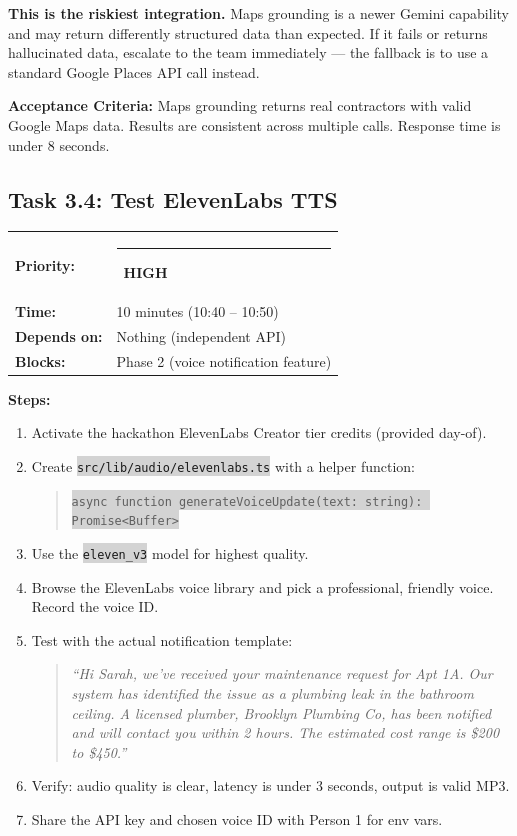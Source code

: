 \documentclass[11pt, a4paper]{article}
\newcommand{\highpri}{\textcolor{highamber}{\rule{6pt}{6pt}}~\textcolor{highamber}{\scriptsize\textbf{HIGH}}}
\newcommand{\code}[1]{\texttt{\small\colorbox{lightgray}{#1}}}
\begin{document}
\begin{warningbox}
\textbf{This is the riskiest integration.} Maps grounding is a newer Gemini capability and may return differently structured data than expected. If it fails or returns hallucinated data, escalate to the team immediately --- the fallback is to use a standard Google Places API call instead.
\end{warningbox}

\textbf{Acceptance Criteria:} Maps grounding returns real contractors with valid Google Maps data. Results are consistent across multiple calls. Response time is under 8 seconds.

\vspace{1em}

\subsection{Task 3.4: Test ElevenLabs TTS}

\begin{tabularx}{\textwidth}{lX}
\textbf{Priority:} & \highpri \\
\textbf{Time:} & 10 minutes (10:40 -- 10:50) \\
\textbf{Depends on:} & Nothing (independent API) \\
\textbf{Blocks:} & Phase 2 (voice notification feature) \\
\end{tabularx}

\vspace{0.3em}

\textbf{Steps:}
\begin{enumerate}[leftmargin=2em, itemsep=2pt]
  \item Activate the hackathon ElevenLabs Creator tier credits (provided day-of).
  \item Create \code{src/lib/audio/elevenlabs.ts} with a helper function:
    \begin{quote}
    \code{async function generateVoiceUpdate(text: string): Promise<Buffer>}
    \end{quote}
  \item Use the \code{eleven\_v3} model for highest quality.
  \item Browse the ElevenLabs voice library and pick a professional, friendly voice. Record the voice ID.
  \item Test with the actual notification template:
    \begin{quote}
    \textit{``Hi Sarah, we've received your maintenance request for Apt 1A. Our system has identified the issue as a plumbing leak in the bathroom ceiling. A licensed plumber, Brooklyn Plumbing Co, has been notified and will contact you within 2 hours. The estimated cost range is \$200 to \$450.''}
    \end{quote}
  \item Verify: audio quality is clear, latency is under 3 seconds, output is valid MP3.
  \item Share the API key and chosen voice ID with Person 1 for env vars.
\end{enumerate}
\end{document}
